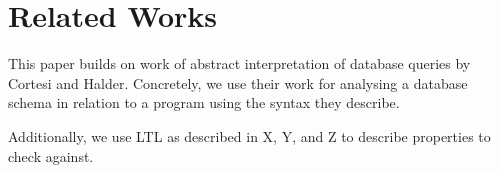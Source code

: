 \section{Related Works}\label{sec:related-works}
This paper builds on work of abstract interpretation of database queries by Cortesi and Halder.
Concretely, we use their work for analysing a database schema in relation to a program using the syntax they describe.

Additionally, we use LTL as described in X, Y, and Z to describe properties to check against.